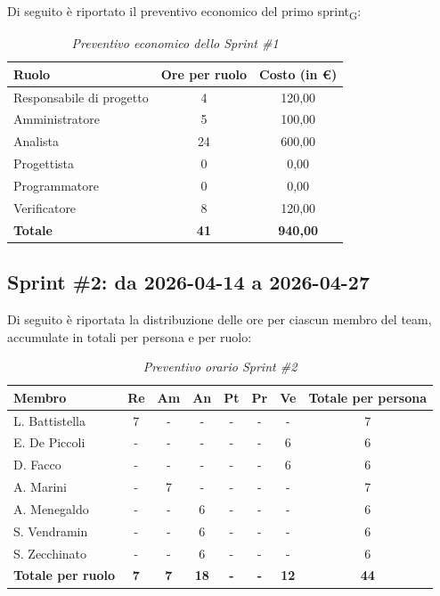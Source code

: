 ﻿\documentclass[a4paper, 10pt, colorlinks=true, linkcolor=black, urlcolor=blue, citecolor=blue, hidelinks]{article}
\renewcommand{\arraystretch}{1.2}
\begin{document}
Di seguito è riportato il preventivo economico del primo sprint\textsubscript{G}:

\begin{table}[H]
    \centering
    \renewcommand{\arraystretch}{1.4}
    \begin{tabular}{|l|c|c|}
        \hline
        \rowcolor{bluBitless!15}
        \textbf{Ruolo} & \textbf{Ore per ruolo} & \textbf{Costo (in €)} \\
        \hline
        Responsabile di progetto & 4 & 120,00 \\ \hline
        Amministratore & 5 & 100,00 \\ \hline
        Analista & 24 & 600,00 \\ \hline
        Progettista & 0 & 0,00 \\ \hline
        Programmatore & 0 & 0,00 \\ \hline
        Verificatore & 8 & 120,00 \\ \hline
        \rowcolor{bluBitless!8}
        \textbf{Totale} & \textbf{41} & \textbf{940,00} \\ \hline
    \end{tabular}
    \caption{\textit{Preventivo economico dello Sprint \#1}}
\end{table}

\subsection{Sprint \#2: da 2026-04-14 a 2026-04-27}
Di seguito è riportata la distribuzione delle ore per ciascun membro del team,
accumulate in totali per persona e per ruolo:
\begin{table}[H]
    \centering
    \renewcommand{\arraystretch}{1.4}
    \begin{tabular}{|l|c|c|c|c|c|c|c|}
        \hline
        \rowcolor{bluBitless!15}
        \textbf{Membro} & \textbf{Re} & \textbf{Am} & \textbf{An} & \textbf{Pt} & \textbf{Pr} & \textbf{Ve} & \textbf{Totale per persona} \\
        \hline
        L. Battistella & 7 & - & - & - & - & - & 7 \\ \hline
        E. De Piccoli & - & - & - & - & - & 6 & 6 \\ \hline
        D. Facco & - & - & - & - & - & 6 & 6 \\ \hline
        A. Marini & - & 7 & - & - & - & - & 7 \\ \hline
        A. Menegaldo & - & - & 6 & - & - & - & 6 \\ \hline
        S. Vendramin & - & - & 6 & - & - & - & 6 \\ \hline
        S. Zecchinato & - & - & 6 & - & - & - & 6 \\ \hline
        \rowcolor{bluBitless!8}
        \textbf{Totale per ruolo} & \textbf{7} & \textbf{7} & \textbf{18} & \textbf{-} & \textbf{-} & \textbf{12} & \textbf{44} \\
        \hline
    \end{tabular}
    \caption{\textit{Preventivo orario Sprint \#2}}
\end{table}
\end{document}
